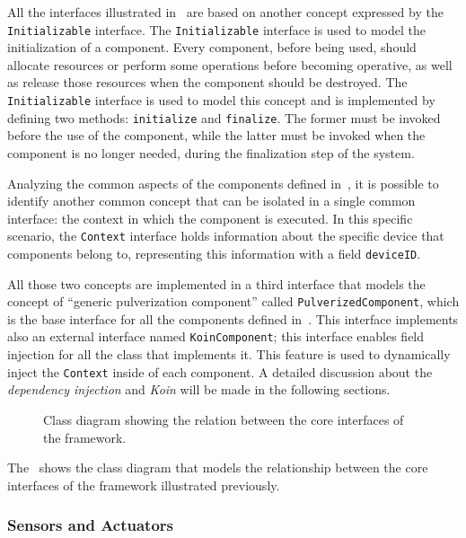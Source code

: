 All the interfaces illustrated in~ are based on another concept expressed by the \texttt{Initializable} interface.
The \texttt{Initializable} interface is used to model the initialization of a component. Every component, before being used, should allocate resources
or perform some operations before becoming operative, as well as release those resources when the component should be destroyed.
The \texttt{Initializable} interface is used to model this concept and is implemented by defining two methods: \texttt{initialize} and
\texttt{finalize}. The former must be invoked before the use of the component, while the latter must be invoked when the component is no longer
needed, during the finalization step of the system.

Analyzing the common aspects of the components defined in~, it is possible to identify another common concept that can
be isolated in a single common interface: the context in which the component is executed. In this specific scenario, the \texttt{Context} interface
holds information about the specific device that components belong to, representing this information with a field \texttt{deviceID}.

All those two concepts are implemented in a third interface that models the concept of ``generic pulverization component'' called
\texttt{PulverizedComponent}, which is the base interface for all the components defined in~.
This interface implements also an external interface named \texttt{KoinComponent}; this interface enables field injection for all the class that
implements it. This feature is used to dynamically inject the \texttt{Context} inside of each component.
A detailed discussion about the \emph{dependency injection} and \emph{Koin} will be made in the following sections.

\begin{figure}
	\centering
	\caption{Class diagram showing the relation between the core interfaces of the framework.}
	\label{fig:core-interfaces-class-diagram}
\end{figure}

The~ shows the class diagram that models the relationship between the core interfaces of the framework
illustrated previously.

\subsubsection{Sensors and Actuators}

